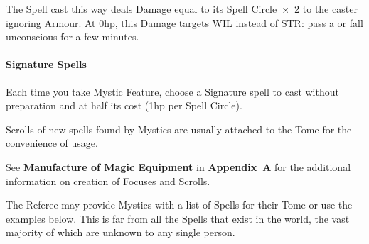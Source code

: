 \documentclass[itdr]{subfiles}
\begin{document}
The Spell cast this way deals Damage equal to its Spell Circle~$\times$~2 to the caster ignoring Armour. At 0hp, this Damage targets WIL instead of STR: pass a  or fall unconscious for a few minutes.

\paragraph{Signature Spells}
Each time you take Mystic Feature, choose a Signature spell to cast without preparation and at half its cost (1hp per Spell Circle).\\
\begin{dbox}
	Scrolls of new spells found by Mystics are usually attached to the Tome for the convenience of usage.
	
	See \textbf{Manufacture of Magic Equipment} in \mbox{\textbf{Appendix A}} for the additional information on creation of Focuses and Scrolls.
\end{dbox}
\break
The Referee may provide Mystics with a list of Spells for their Tome or use the examples below. This is far from all the Spells that exist in the world, the vast majority of which are unknown to any single person.
\end{document}
